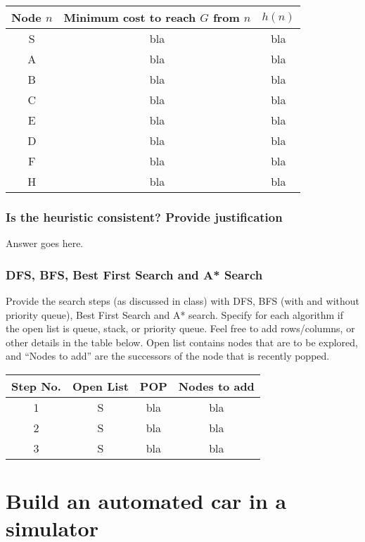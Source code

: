 \documentclass[12pt, letterpaper]{article}
\begin{document}
\begin{center}
    \begin{tabular}{|c|c|c|} 
    \hline
    Node $n$ & Minimum cost to reach $G$ from $n$ & $h(n)$ \\ 
    \hline
    S & bla & bla \\
    \hline
    A & bla & bla \\
    \hline
    B & bla & bla \\
    \hline
    C & bla & bla \\
    \hline
    E & bla & bla \\
    \hline
    D & bla & bla \\
    \hline
    F & bla & bla \\
    \hline
    H & bla & bla \\
    \hline
    \end{tabular}
\end{center}

\subsubsection{Is the heuristic consistent? Provide justification}
Answer goes here.

\subsubsection{DFS, BFS, Best First Search and A* Search}
Provide the search steps (as discussed in class) with DFS, BFS (with and without priority
queue), Best First Search and A* search. Specify for each algorithm if the open list is
queue, stack, or priority queue. Feel free to add rows/columns, or other details in the
table below. Open list contains nodes that are to be explored, and “Nodes to add” are
the successors of the node that is recently popped.


\begin{center}
    \begin{tabular}{|c|c|c|c|} 
    \hline
    Step No. & Open List & POP & Nodes to add \\ 
    \hline
    1 & S & bla & bla \\
    \hline
    2 & S & bla & bla \\
    \hline
    3 & S & bla & bla \\
    \hline
    \end{tabular}
\end{center}

\section{Build an automated car in a simulator}
\end{document}
